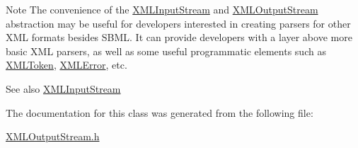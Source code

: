 \begin{DoxyNote}{Note}
The convenience of the \hyperlink{class_x_m_l_input_stream}{X\+M\+L\+Input\+Stream} and \hyperlink{class_x_m_l_output_stream}{X\+M\+L\+Output\+Stream} abstraction may be useful for developers interested in creating parsers for other X\+ML formats besides S\+B\+ML. It can provide developers with a layer above more basic X\+ML parsers, as well as some useful programmatic elements such as \hyperlink{class_x_m_l_token}{X\+M\+L\+Token}, \hyperlink{class_x_m_l_error}{X\+M\+L\+Error}, etc.
\end{DoxyNote}
\begin{DoxySeeAlso}{See also}
\hyperlink{class_x_m_l_input_stream}{X\+M\+L\+Input\+Stream} 
\end{DoxySeeAlso}


The documentation for this class was generated from the following file\+:\begin{DoxyCompactItemize}
\item 
\hyperlink{_x_m_l_output_stream_8h}{X\+M\+L\+Output\+Stream.\+h}\end{DoxyCompactItemize}

